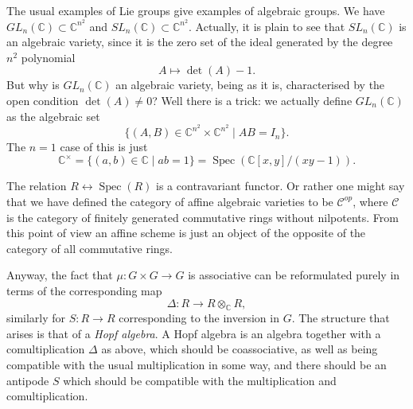 \documentclass[12pt]{article}
\theoremstyle{plain}
\theoremstyle{definition}
\numberwithin{equation}{section}
\DeclareMathOperator{\spec}{Spec}
\newcommand{\op}{op}
\newcommand{\C}{\mathbb{C}}
\newcommand{\CC}{\mathcal{C}}
\begin{document}
The usual examples of Lie groups give examples of algebraic groups. We have $GL_n(\C) \subset \C^{n^2}$ and $SL_n(\C) \subset \C^{n^2}$. Actually, it is plain to see that $SL_n(\C)$ is an algebraic variety, since it is the zero set of the ideal generated by the degree $n^2$ polynomial
\[
A \mapsto \det(A) - 1.
\]
But why is $GL_n(\C)$ an algebraic variety, being as it is, characterised by the open condition $\det(A) \neq 0$? Well there is a trick: we actually define $GL_n(\C)$ as the algebraic set
\[
\{(A, B) \in \C^{n^2} \times \C^{n^2} \mid AB = I_n\}.
\]
The $n=1$ case of this is just
\[
\C^\times = \{(a, b) \in \C \mid ab = 1\} = \spec(\C[x, y] / (xy-1)).
\]


The relation $R \leftrightarrow \spec(R)$ is a contravariant functor. Or rather one might say that we have defined the category of affine algebraic varieties to be $\CC^{\op}$, where $\CC$ is the category of finitely generated commutative rings without nilpotents. From this point of view an affine scheme is just an object of the opposite of the category of all commutative rings.

Anyway, the fact that $\mu : G \times G \rightarrow G$ is associative can be reformulated purely in terms of the corresponding map
\[
\Delta : R \rightarrow R \otimes_\C R,
\]
similarly for $S : R \rightarrow R$ corresponding to the inversion in $G$. The structure that arises is that of a \emph{Hopf algebra}. A Hopf algebra is an algebra together with a comultiplication $\Delta$ as above, which should be coassociative, as well as being compatible with the usual multiplication in some way, and there should be an antipode $S$ which should be compatible with the multiplication and comultiplication.
\end{document}
